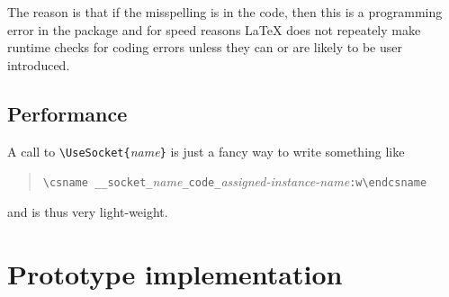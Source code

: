 \documentclass{article}
\newcommand\cs[1]{\texttt{\textbackslash #1}}
\newcommand\meta[1]{\textlangle\textit{#1}\textrangle}
\newcommand\marg[1]{\texttt\{\meta{#1}\texttt\}}
\begin{document}
The reason is that if the misspelling is in the code, then this is a
programming error in the package and for speed reasons \LaTeX{} does
not repeately make runtime checks for coding errors unless they can or
are likely to be user introduced.

\subsection{Performance}

A call to \cs{UseSocket}\marg{name} is just a fancy way to write something like
\begin{quote}
  \verb=\csname __socket_=\meta{name}\verb=_code_=\meta{assigned-instance-name}\verb=:w\endcsname=
\end{quote}
and is thus very light-weight.



\section{Prototype implementation}

\begin{verbatim}
\end{verbatim}
\end{document}
